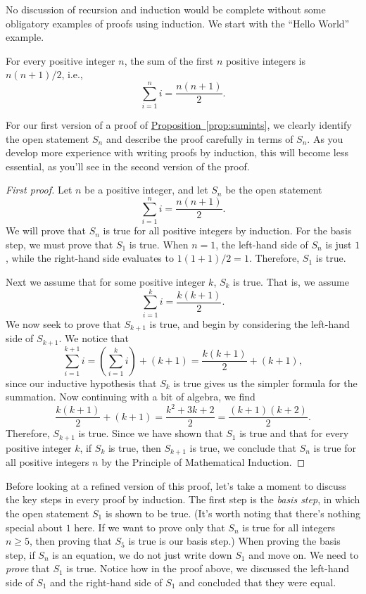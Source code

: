 No discussion of recursion and induction would be
complete without some obligatory examples of proofs using
induction.  We start with the ``Hello World'' example. 

\begin{proposition}\label{prop:sumints}
  For every positive integer $n$, the sum of the first $n$ positive
  integers is $n(n+1)/2$, i.e.,
\[
\sum_{i=1}^n i=\frac{n(n+1)}{2}.
\]
\end{proposition}

For our first version of a proof of
\hyperref[prop:sumints]{Proposition~\ref*{prop:sumints}}, we clearly
identify the open statement $S_n$ and describe the proof carefully in
terms of $S_n$. As you develop more experience with writing proofs by
induction, this will become less essential, as you'll see in the
second version of the proof.

\begin{proof}[First proof]
  Let $n$ be a positive integer, and let $S_n$ be the open statement 
  \[\sum_{i=1}^n i = \frac{n(n+1)}{2}.\]
  We will prove that $S_n$ is true for all positive integers by
  induction. For the basis step, we must prove that $S_1$ is
  true. When $n=1$, the left-hand side of $S_n$ is just $1$, while the
  right-hand side evaluates to $1(1+1)/2=1$. Therefore, $S_1$ is true.

  Next we assume that for some positive integer $k$, $S_k$ is
  true. That is, we assume 
  \[
  \sum_{i=1}^k i=\frac{k(k+1)}{2}.
  \]
  We now seek to prove that $S_{k+1}$ is true, and begin by
  considering the left-hand side of $S_{k+1}$. We notice that
  \[
  \sum_{i=1}^{k+1}i=\left(\sum_{i=1}^k i\right) +(k+1)=
  \frac{k(k+1)}{2}+(k+1),\]
  since our inductive hypothesis that $S_k$ is true gives us the
  simpler formula for the summation. Now continuing with a bit of
  algebra, we find
  \[\frac{k(k+1)}{2}+(k+1)=\frac{k^2+3k+2}{2}=\frac{(k+1)(k+2)}{2}.
  \]
  Therefore, $S_{k+1}$ is true.  Since we have shown that $S_1$ is
  true and that for every positive integer $k$, if $S_k$ is true,
  then $S_{k+1}$ is true, we conclude that $S_n$ is true for all
  positive integers $n$ by the Principle of
  Mathematical Induction.
\end{proof}

Before looking at a refined version of this proof, let's take a moment
to discuss the key steps in every proof by induction. The first step
is the \emph{basis step}, in which the open statement $S_1$ is shown to be
true. (It's worth noting that there's nothing special about $1$
here. If we want to prove only that $S_n$ is true for all integers
$n\geq 5$, then proving that $S_5$ is true is our basis step.) When
proving the basis step, if $S_n$ is an equation, we do not just write
down $S_1$ and move on. We need to \emph{prove} that $S_1$ is
true. Notice how in the proof above, we discussed the left-hand side
of $S_1$ and the right-hand side of $S_1$ and concluded that they were
equal.

